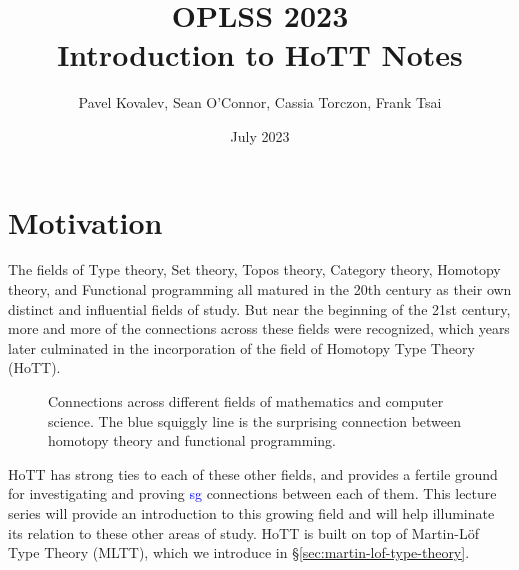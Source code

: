 \documentclass{amsart}
\title[Introduction to HoTT Notes]{OPLSS 2023 \\
Introduction to HoTT Notes}
\author{Pavel Kovalev, Sean O'Connor, Cassia Torczon, Frank Tsai}
\date{July 2023}
\theoremstyle{definition}
\newcommand{\surprising}{\textcolor{blue}{s\uwave{urprisin}g} $\text{}$}
\begin{document}
\maketitle
\tableofcontents

\section{Motivation}
\label{sec:motivation}

The fields of Type theory, Set theory, Topos theory, Category theory, Homotopy theory, and Functional programming all matured in the 20th century as their own distinct and influential fields of study. But near the beginning of the 21st century, more and more of the connections across these fields were recognized, which years later culminated in the incorporation of the field of Homotopy Type Theory (HoTT).

\begin{figure}[h]
    \centering
    
    \caption{Connections across different fields of mathematics and computer science.
    The blue squiggly line is the surprising connection between homotopy theory and functional programming.}
    \label{fig:connections-across-fields}
\end{figure}

HoTT has strong ties to each of these other fields, and provides a fertile ground for investigating and proving \surprising connections between each of them. This lecture series will provide an introduction to this growing field and will help illuminate its relation to these other areas of study.
HoTT is built on top of Martin-L\"{o}f Type Theory (MLTT), which we introduce in \S\ref{sec:martin-lof-type-theory}.
\end{document}
